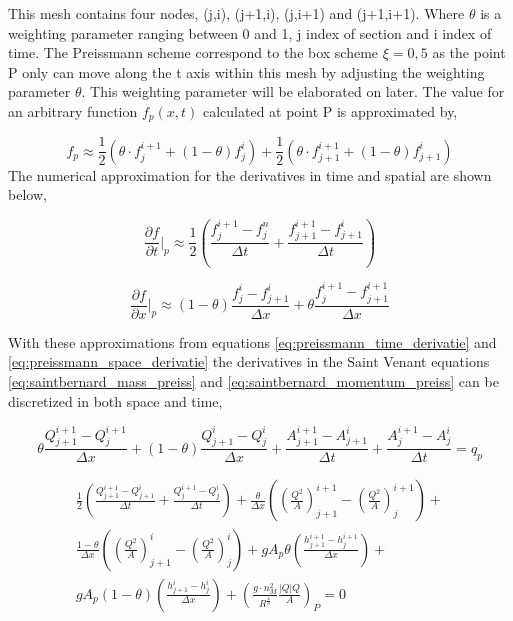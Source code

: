 This mesh contains four nodes, (j,i), (j+1,i), (j,i+1) and (j+1,i+1). Where $\theta$ is a weighting parameter ranging between 0 and 1, j index of section and i index of time. The Preissmann scheme correspond to the box scheme $\xi = 0,5$ as the point P only can move along the t axis within this mesh by adjusting the weighting parameter $\theta$. This weighting parameter will be elaborated on later. The value for an arbitrary function $f_p(x,t)$ calculated at point P is approximated by, 

\begin{equation}\label{eq:approximated_function}
	f_p \approx \frac{1}{2} (\theta \cdot f_j^{i+1}+(1-\theta)f_j^i)+\frac{1}{2}(\theta\cdot f_{j+1}^{i+1}+(1-\theta)f_{j+1}^i)
\end{equation}
The numerical approximation for the derivatives in time and spatial are shown below, 

\begin{equation}\label{eq:preissmann_time_derivatie}
	\frac{\partial f}{\partial t}\bigg \rvert_p \approx \frac{1}{2}\left(\frac{f_j^{i+1}-f_j^n}{\Delta t}+\frac{f_{j+1}^{i+1}-f_{j+1}^i}{\Delta t}\right)
\end{equation}

\begin{equation}\label{eq:preissmann_space_derivatie}
	\frac{\partial f}{\partial x}\bigg \rvert_p \approx (1-\theta)\frac{f_j^i-f_{j+1}^i}{\Delta x}+\theta \frac{f_j^{i+1}-f_{j+1}^{i+1}}{\Delta x}
\end{equation}

With these approximations from equations \ref{eq:preissmann_time_derivatie} and \ref{eq:preissmann_space_derivatie} the derivatives in the Saint Venant equations \ref{eq:saintbernard_mass_preiss} and \ref{eq:saintbernard_momentum_preiss} can be discretized in both space and time, 

\begin{equation}\label{eq:continuity_eq_preissmann}
	\theta \frac{Q_{j+1}^{i+1}-Q_j^{i+1}}{\Delta x}+(1-\theta)\frac{Q_{j+1}^i - Q_j^i}{\Delta x}+
	\frac{A_{j+1}^{i+1}-A_{j+1}^i}{\Delta t}+\frac{A_{j}^{i+1} - A_j^i}{\Delta t} = q_p
\end{equation}

\begin{multline}
	\frac{1}{2} \left(\frac{Q_{j+1}^{i+1}-Q_{j+1}^i}{\Delta t}+\frac{Q_{j}^{i+1} - Q_j^i}{\Delta t}\right) + \frac{\theta}{\Delta x} \left(\left(\frac{Q^2}{A}\right)_{j+1}^{i+1}-\left(\frac{Q^2}{A}\right)_{j}^{i+1}\right) + \\ \frac{1-\theta}{\Delta x}\left(\left(\frac{Q^2}{A}\right)_{j+1}^{i}-\left(\frac{Q^2}{A}\right)_{j}^{i}\right)+gA_p\theta \left(\frac{h_{j+1}^{i+1}-h_j^{i+1}}{\Delta x}\right)+ \\ gA_p(1-\theta)\left(\frac{h_{j+1}^{i} - h_j^i}{\Delta x}\right)+\left(\frac{g\cdot n_M^2}{R^\frac{4}{3}}\frac{|Q|Q}{A}\right)_P = 0 
\end{multline}

